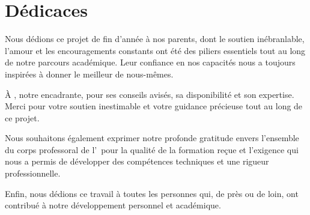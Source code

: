 \chapter*{Dédicaces}

Nous dédions ce projet de fin d'année à nos parents, dont le soutien inébranlable, l'amour et les encouragements constants ont été des piliers essentiels tout au long de notre parcours académique. Leur confiance en nos capacités nous a toujours inspirées à donner le meilleur de nous-mêmes.

À \encadrante, notre encadrante, pour ses conseils avisés, sa disponibilité et son expertise. Merci pour votre soutien inestimable et votre guidance précieuse tout au long de ce projet.

Nous souhaitons également exprimer notre profonde gratitude envers l'ensemble du corps professoral de l'\ecole\ pour la qualité de la formation reçue et l'exigence qui nous a permis de développer des compétences techniques et une rigueur professionnelle.

Enfin, nous dédions ce travail à toutes les personnes qui, de près ou de loin, ont contribué à notre développement personnel et académique.
